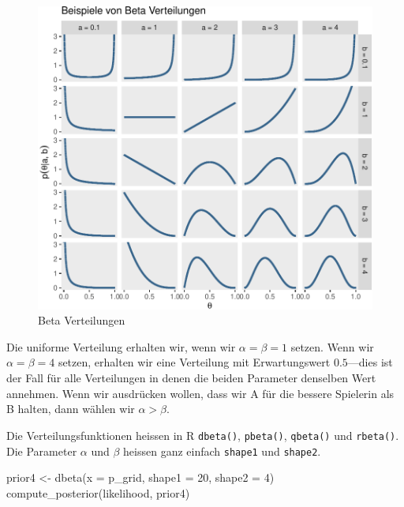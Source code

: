 \documentclass[]{tufte-handout}
\newenvironment{Shaded}{}{}
\newcommand{\AttributeTok}[1]{\textcolor[rgb]{0.49,0.56,0.16}{#1}}
\newcommand{\DecValTok}[1]{\textcolor[rgb]{0.25,0.63,0.44}{#1}}
\newcommand{\FunctionTok}[1]{\textcolor[rgb]{0.02,0.16,0.49}{#1}}
\newcommand{\NormalTok}[1]{#1}
\newcommand{\OtherTok}[1]{\textcolor[rgb]{0.00,0.44,0.13}{#1}}
\begin{document}
\begin{figure}
\includegraphics{01-intro-bayesian-stats_files/figure-latex/betadists-1} \caption[Beta Verteilungen]{Beta Verteilungen}\label{fig:betadists}
\end{figure}

Die uniforme Verteilung erhalten wir, wenn wir \(\alpha = \beta = 1\)
setzen. Wenn wir \(\alpha = \beta = 4\) setzen, erhalten wir eine
Verteilung mit Erwartungswert \(0.5\)---dies ist der Fall für alle
Verteilungen in denen die beiden Parameter denselben Wert annehmen. Wenn
wir ausdrücken wollen, dass wir A für die bessere Spielerin als B
halten, dann wählen wir \(\alpha > \beta\).

Die Verteilungsfunktionen heissen in R \texttt{dbeta()},
\texttt{pbeta()}, \texttt{qbeta()} und \texttt{rbeta()}. Die Parameter
\(\alpha\) und \(\beta\) heissen ganz einfach \texttt{shape1} und
\texttt{shape2}.

\begin{Shaded}
\begin{Highlighting}[]
\NormalTok{prior4 }\OtherTok{\textless{}{-}} \FunctionTok{dbeta}\NormalTok{(}\AttributeTok{x =}\NormalTok{ p\_grid, }\AttributeTok{shape1 =} \DecValTok{20}\NormalTok{, }\AttributeTok{shape2 =} \DecValTok{4}\NormalTok{)}
\FunctionTok{compute\_posterior}\NormalTok{(likelihood, prior4)}
\end{Highlighting}
\end{Shaded}
\end{document}
